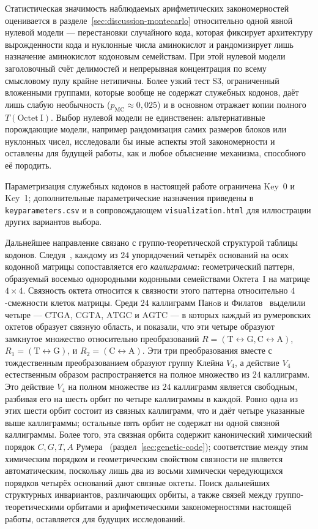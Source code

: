 \documentclass[11pt,a4paper]{article}
\renewcommand{\_}{\origunderscore\allowbreak}
\begin{document}
Статистическая значимость наблюдаемых арифметических
закономерностей оценивается в
разделе~\ref{sec:discussion-montecarlo} относительно одной явной
нулевой модели --- перестановки случайного кода, которая
фиксирует архитектуру вырожденности кода и нуклонные числа
аминокислот и рандомизирует лишь назначение аминокислот
кодоновым семействам. При этой нулевой модели заголовочный счёт
делимостей и непрерывная концентрация по всему смысловому пулу
крайне нетипичны. Более узкий тест S3, ограниченный вложенными
группами, которые вообще не содержат служебных кодонов, даёт лишь
слабую необычность ($p_{\mathrm{MC}} \approx 0{,}025$) и в основном
отражает копии полного $T(\mathrm{Octet~I})$. Выбор
нулевой модели не единственен: альтернативные порождающие модели,
например рандомизация самих размеров блоков или нуклонных чисел,
исследовали бы иные аспекты этой закономерности и оставлены для
будущей работы, как и любое объяснение механизма, способного её
породить.

Параметризация служебных кодонов в настоящей
работе ограничена Key~0 и Key~1;
дополнительные параметрические назначения
приведены в \texttt{key\_parameters.csv} и в
сопровождающем \texttt{visualization.html}
для иллюстрации других вариантов выбора.

Дальнейшее направление связано с группо-теоретической
структурой таблицы кодонов. Следуя~\citet{panov2024},
каждому из $24$ упорядочений четырёх оснований на
осях кодонной матрицы сопоставляется его
\emph{каллиграмма}: геометрический паттерн,
образуемый восемью однородными кодонными семействами
Октета~I на матрице
$4 \times 4$. Связность октета относится к
связности этого паттерна относительно
$4$-смежности клеток матрицы. Среди $24$
каллиграмм Панoв и Филатов~\cite{panov2024}
выделили четыре ---
$\mathrm{CTGA}$, $\mathrm{CGTA}$, $\mathrm{ATGC}$
и $\mathrm{AGTC}$ --- в которых каждый из
румеровских октетов образует связную область, и показали, что
эти четыре образуют замкнутое множество относительно
преобразований
$R = (\mathrm{T} \leftrightarrow \mathrm{G},
\mathrm{C} \leftrightarrow \mathrm{A})$,
$R_1 = (\mathrm{T} \leftrightarrow \mathrm{G})$, и
$R_2 = (\mathrm{C} \leftrightarrow \mathrm{A})$.
Эти три преобразования вместе с тождественным
преобразованием образуют группу Клейна $V_4$, а
действие $V_4$ естественным образом распространяется
на полное множество из $24$ каллиграмм. Это действие
$V_4$ на полном множестве из $24$ каллиграмм является
свободным, разбивая его на шесть орбит по четыре
каллиграммы в каждой. Ровно одна из этих шести орбит
состоит из связных каллиграмм, что и даёт четыре
указанные выше каллиграммы; остальные пять орбит не
содержат ни одной связной каллиграммы. Более того,
эта связная орбита содержит канонический химический
порядок $C, G, T, A$ Румера~\cite{rumer1968}
(раздел~\ref{sec:genetic-code}); соответствие
между этим химическим порядком и геометрическим
свойством связности не является автоматическим,
поскольку лишь два из восьми химически чередующихся порядков четырёх оснований дают связные октеты. Поиск дальнейших
структурных инвариантов, различающих орбиты, а также
связей между группо-теоретическими орбитами и
арифметическими закономерностями настоящей работы,
оставляется для будущих исследований.
\end{document}
